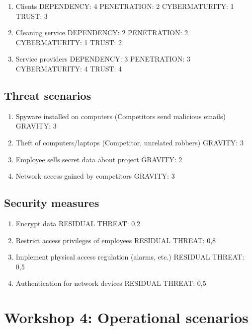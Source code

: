 \begin{enumerate}
\tightlist
\item
  Clients DEPENDENCY: 4 PENETRATION: 2 CYBERMATURITY: 1 TRUST: 3
\item
  Cleaning service DEPENDENCY: 2 PENETRATION: 2 CYBERMATURITY: 1 TRUST:
  2
\item
  Service providers DEPENDENCY: 3 PENETRATION: 3 CYBERMATURITY: 4 TRUST:
  4
\end{enumerate}

\hypertarget{Threatux20scenarios}{%
\subsection{Threat scenarios}\label{Threatux20scenarios}}

\begin{enumerate}
\tightlist
\item
  Spyware installed on computers (Competitors send malicious emails)
  GRAVITY: 3
\item
  Theft of computers/laptops (Competitor, unrelated robbers) GRAVITY: 3
\item
  Employee sells secret data about project GRAVITY: 2
\item
  Network access gained by competitors GRAVITY: 3
\end{enumerate}

\hypertarget{Securityux20measures}{%
\subsection{Security measures}\label{Securityux20measures}}

\begin{enumerate}
\tightlist
\item
  Encrypt data RESIDUAL THREAT: 0,2
\item
  Restrict access privileges of employees RESIDUAL THREAT: 0,8
\item
  Implement physical access regulation (alarms, etc.) RESIDUAL THREAT:
  0,5
\item
  Authentication for network devices RESIDUAL THREAT: 0,5
\end{enumerate}

\hypertarget{Workshopux204:ux20Operationalux20scenarios}{%
\section{Workshop 4: Operational
scenarios}\label{Workshopux204:ux20Operationalux20scenarios}}

